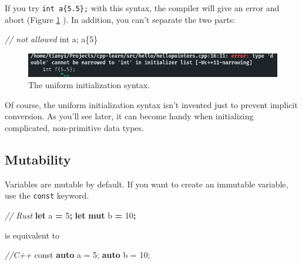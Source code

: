 \documentclass[
]{book}
\newenvironment{Shaded}{\begin{snugshade}}{\end{snugshade}}
\newcommand{\AttributeTok}[1]{\textcolor[rgb]{0.77,0.63,0.00}{#1}}
\newcommand{\CommentTok}[1]{\textcolor[rgb]{0.56,0.35,0.01}{\textit{#1}}}
\newcommand{\DataTypeTok}[1]{\textcolor[rgb]{0.13,0.29,0.53}{#1}}
\newcommand{\DecValTok}[1]{\textcolor[rgb]{0.00,0.00,0.81}{#1}}
\newcommand{\KeywordTok}[1]{\textcolor[rgb]{0.13,0.29,0.53}{\textbf{#1}}}
\newcommand{\NormalTok}[1]{#1}
\newcommand{\OperatorTok}[1]{\textcolor[rgb]{0.81,0.36,0.00}{\textbf{#1}}}
\begin{document}
If you try \texttt{int\ a\{5.5\};} with this syntax, the compiler will give an error and abort (Figure \ref{fig:braces} ). In addition, you can't separate the two parts:

\begin{Shaded}
\begin{Highlighting}[]
\CommentTok{// not allowed}
\DataTypeTok{int}\NormalTok{ a;}
\NormalTok{a\{}\DecValTok{5}\NormalTok{\}}
\end{Highlighting}
\end{Shaded}

\begin{figure}
\centering
\includegraphics{img/brace.png}
\caption{\label{fig:braces}The uniform initialization syntax.}
\end{figure}

Of course, the uniform initialization syntax isn't invented just to prevent implicit conversion. As you'll see later, it can become handy when initializing complicated, non-primitive data types.

\hypertarget{mutability}{%
\subsection{Mutability}\label{mutability}}

Variables are mutable by default. If you want to create an immutable variable, use the \texttt{const} keyword.

\begin{Shaded}
\begin{Highlighting}[]
\CommentTok{// Rust}
\KeywordTok{let}\NormalTok{ a }\OperatorTok{=} \DecValTok{5}\OperatorTok{;}
\KeywordTok{let} \KeywordTok{mut}\NormalTok{ b }\OperatorTok{=} \DecValTok{10}\OperatorTok{;}
\end{Highlighting}
\end{Shaded}

is equivalent to

\begin{Shaded}
\begin{Highlighting}[]
\CommentTok{//C++}
\AttributeTok{const} \KeywordTok{auto}\NormalTok{ a = }\DecValTok{5}\NormalTok{;}
\KeywordTok{auto}\NormalTok{ b = }\DecValTok{10}\NormalTok{;}
\end{Highlighting}
\end{Shaded}
\end{document}
